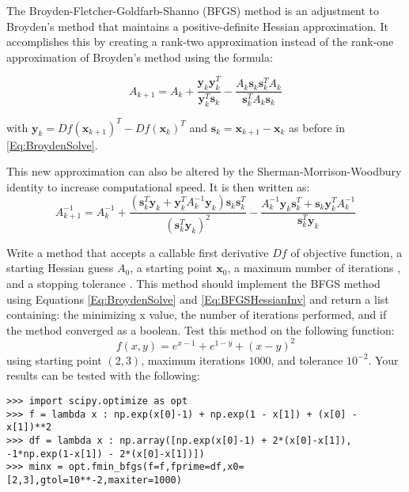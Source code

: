 The Broyden-Fletcher-Goldfarb-Shanno (BFGS) method is an adjustment to Broyden's method that maintains a positive-definite Hessian approximation.
It accomplishes this by creating a rank-two approximation instead of the rank-one approximation of Broyden's method using the formula: 

\begin{equation} \label{Eq:BFGSHessian}
A_{k+1} = A_k + \frac{\mathbf{y}_k\mathbf{y}_k^T}{\mathbf{y}_k^T\mathbf{s}_k}-\frac{A_k\mathbf{s}_k\mathbf{s}_k^TA_k}{\mathbf{s}_k^TA_k\mathbf{s}_k}
\end{equation}
 
\noindent with $\mathbf{y}_k = Df(\mathbf{x}_{k+1})^T-Df(\mathbf{x}_k)^T$ and $\mathbf{s}_k=\mathbf{x}_{k+1}-\mathbf{x}_k$ as before in \ref{Eq:BroydenSolve}.

This new approximation can also be altered by the Sherman-Morrison-Woodbury identity to increase computational speed. It is then written as:
\begin{equation} \label{Eq:BFGSHessianInv}
A_{k+1}^{-1} = A_k^{-1} + \frac{(\mathbf{s}_k^T\mathbf{y}_k + \mathbf{y}_k^TA_k^{-1}\mathbf{y}_k)\mathbf{s}_k\mathbf{s}_k^T}{(\mathbf{s}_k^T\mathbf{y}_k)^2} - \frac{A_k^{-1}\mathbf{y}_k\mathbf{s}_k^T + \mathbf{s}_k\mathbf{y}_k^TA_k^{-1}}{\mathbf{s}_k^T\mathbf{y}_k}
\end{equation}

\begin{problem}
Write a method that accepts a callable first derivative $Df$ of objective function, a starting Hessian guess $A_0$, a starting point $\textbf{x}_0$, a maximum number of iterations , and a stopping tolerance .
This method should implement the BFGS method using Equations \ref{Eq:BroydenSolve} and \ref{Eq:BFGSHessianInv} and return a list containing: the minimizing x value, the number of iterations performed, and if the method converged as a boolean.
Test this method on the following function:
\[
f(x,y) = e^{x-1}+e^{1-y}+(x-y)^2
\]
using starting point $(2,3)$, maximum iterations $1000$, and tolerance $10^{-2}$.
Your results can be tested with the following:
\begin{lstlisting}
>>> import scipy.optimize as opt
>>> f = lambda x : np.exp(x[0]-1) + np.exp(1 - x[1]) + (x[0] - x[1])**2
>>> df = lambda x : np.array([np.exp(x[0]-1) + 2*(x[0]-x[1]), -1*np.exp(1-x[1]) - 2*(x[0]-x[1])])
>>> minx = opt.fmin_bfgs(f=f,fprime=df,x0=[2,3],gtol=10**-2,maxiter=1000)
\end{lstlisting}
\end{problem}

